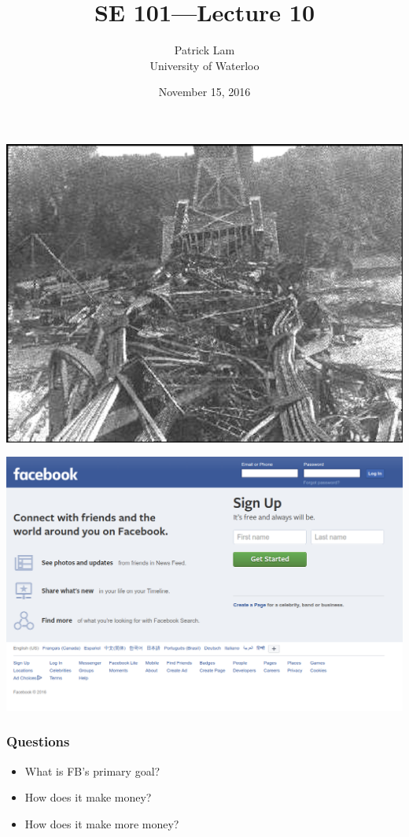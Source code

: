 \documentclass{beamer}
\title{SE 101---Lecture 10}
\author{Patrick Lam\\University of Waterloo}
\date{November 15, 2016}
\begin{document}
\begin{frame}
  \titlepage
\end{frame}

\begin{frame}
\includegraphics[width=\textwidth]{images/Quebec_Bridge_Collapse_of_1907.jpg}
\end{frame}

\begin{frame}
\begin{center}
\includegraphics[width=\textwidth]{images/fb.png}
\end{center}
\end{frame}

\begin{frame}
\frametitle{Questions}
\begin{itemize}
\item What is FB's primary goal?
\item How does it make money?
\item How does it make more money?
\end{itemize}
\end{frame}
\end{document}
